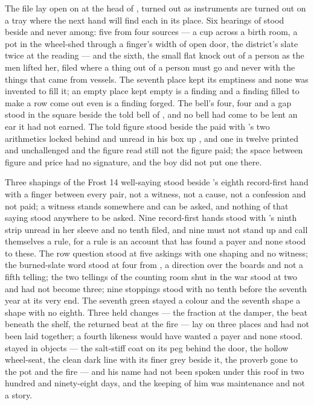 The file lay open on  at the head of , turned out as instruments are turned out on a tray where the next hand will find each in its place. Six hearings of  stood beside and never among: five from four sources --- a cup across a birth room, a pot in the wheel-shed through a finger's width of open door, the district's slate twice at the reading --- and the sixth, the small flat knock out of a person as the men lifted her, filed where a thing out of a person must go and never with the things that came from vessels. The seventh place kept its emptiness and none was invented to fill it; an empty place kept empty is a finding and a finding filled to make a row come out even is a finding forged. The bell's four, four and a gap stood in the square beside the told bell of , and no bell had come to be lent an ear it had not earned. The told figure stood beside the paid with 's two arithmetics locked behind and unread in his box up , and one in twelve printed and unchallenged and the figure read still not the figure paid; the space between figure and price had no signature, and the boy did not put one there.

Three shapings of the Frost 14 well-saying stood beside 's eighth record-first hand with a finger between every pair, not a witness, not a cause, not a confession and not paid; a witness stands somewhere and can be asked, and nothing of that saying stood anywhere to be asked. Nine record-first hands stood with 's ninth strip unread in her sleeve and no tenth filed, and nine must not stand up and call themselves a rule, for a rule is an account that has found a payer and none stood to these. The row question stood at five askings with one shaping and no witness; the burned-slate word stood at four from , a direction over the boards and not a fifth telling; the two tellings of the counting room shut in the war stood at two and had not become three; nine stoppings stood with no tenth before the seventh year at its very end. The seventh green stayed a colour and the seventh shape a shape with no eighth. Three held changes --- the fraction at the damper, the beat beneath the shelf, the returned beat at the fire --- lay on three places and had not been laid together; a fourth likeness would have wanted a payer and none stood.  stayed in objects --- the salt-stiff coat on its peg behind the door, the hollow wheel-seat, the clean dark line with its finer grey beside it, the proverb gone to the pot and the fire --- and his name had not been spoken under this roof in two hundred and ninety-eight days, and the keeping of him was maintenance and not a story.

